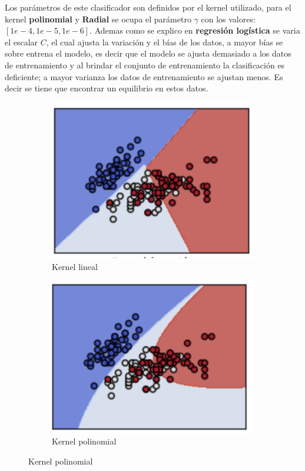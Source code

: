 Los parámetros de este clasificador son definidos por el kernel utilizado, para el kernel \textbf{polinomial} y \textbf{Radial} se ocupa el parámetro $\gamma$ con los valores: $[1e-4, 1e-5, 1e-6]$. Ademas como se explico en \textbf{regresión logística} se varia el escalar $C$, el cual ajusta la variación y el bías de los datos, a mayor bías se sobre entrena el modelo, es decir que el modelo se ajusta demasiado a los datos de entrenamiento y al brindar el conjunto de entrenamiento la clasificación es deficiente; a mayor varianza los datos de entrenamiento se ajustan menos. Es decir se tiene que encontrar un equilibrio en estos datos.\\



\begin{figure}[H]
\centering
	\begin{subfigure}{.5\textwidth}
	\centering
	\includegraphics[scale=0.8]{imagenes/capitulo5/Entrenamiento/klineal.png}
	\caption{Kernel lineal}
	\label{fig:cp5:klineal}
	\end{subfigure}%
	\begin{subfigure}{.5\textwidth}
	\centering
	\includegraphics[scale=0.8]{imagenes/capitulo5/Entrenamiento/kpoli.png}
	\caption{Kernel polinomial}
	\label{fig:cp5:kpoli}
	\end{subfigure}%
\end{figure}

